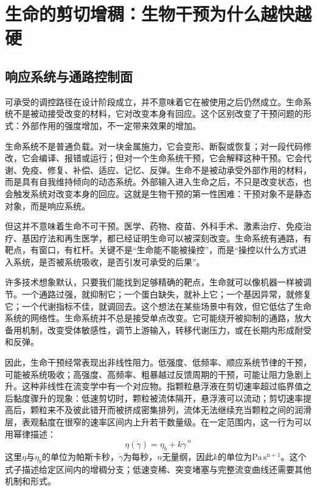 \section{生命的剪切增稠：生物干预为什么越快越硬}

\subsection{响应系统与通路控制面}

可承受的调控路径在设计阶段成立，并不意味着它在被使用之后仍然成立。生命系统不是被动接受改变的材料，它对改变本身有回应。这个区别改变了干预问题的形式：外部作用的强度增加，不一定带来效果的增加。


生命系统不是普通负载。对一块金属施力，它会变形、断裂或恢复；对一段代码修改，它会编译、报错或运行；但对一个生命系统干预，它会解释这种干预。它会代谢、免疫、修复、补偿、适应、记忆、反弹。生命不是被动承受外部作用的材料，而是具有自我维持倾向的动态系统。外部输入进入生命之后，不只是改变状态，也会触发系统对改变本身的回应。这就是生物干预的第一性困难：干预对象不是静态对象，而是响应系统。

但这并不意味着生命不可干预。医学、药物、疫苗、外科手术、激素治疗、免疫治疗、基因疗法和再生医学，都已经证明生命可以被深刻改变。生命系统有通路，有靶点，有窗口，有杠杆。关键不是“生命能不能被操控”，而是“操控以什么方式进入系统，是否被系统吸收，是否引发可承受的后果”。

许多技术想象默认，只要我们能找到足够精确的靶点，生命就可以像机器一样被调节。一个通路过强，就抑制它；一个蛋白缺失，就补上它；一个基因异常，就修复它；一个代谢指标不佳，就调回去。这个想法在某些场景中有效，但它低估了生命系统的网络性。生命系统并不总是接受单点改变。它可能绕开被抑制的通路，放大备用机制，改变受体敏感性，调节上游输入，转移代谢压力，或在长期内形成耐受和反弹。

因此，生命干预经常表现出非线性阻力。低强度、低频率、顺应系统节律的干预，可能被系统吸收；高强度、高频率、粗暴越过反馈周期的干预，可能让阻力急剧上升。这种非线性在流变学中有一个对应物。指颗粒悬浮液在剪切速率超过临界值之后黏度骤升的现象：低速剪切时，颗粒被流体隔开，悬浮液可以流动；剪切速率提高后，颗粒来不及彼此错开而被挤成密集排列，流体无法继续充当颗粒之间的润滑层，表观黏度在很窄的速率区间内上升若干数量级\cite{brown2014shear}。在一定范围内，这一行为可以用幂律描述：
\begin{equation}
\eta(\dot\gamma)=\eta_b+k\dot\gamma^{\,n}
\label{eq:ch28-thickening}
\end{equation}
这里$\eta$与$\eta_b$的单位为帕斯卡秒，$\dot\gamma$为每秒，$n$无量纲，因此$k$的单位为$\mathrm{Pa\,s^{n+1}}$。这个式子描述给定区间内的增稠分支；低速变稀、突变堵塞与完整流变曲线还需要其他机制和形式。

